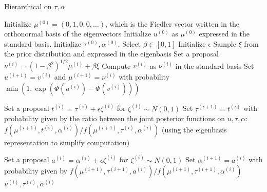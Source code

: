 \documentclass{siamart1116}
\begin{document}
\begin{algorithm}
\caption{Hierarchical on $\tau, \alpha$}
\label{alg:hierarchical_tau_alpha}
\begin{algorithmic}
\State Initialize $\mu^{(0)} = (0, 1, 0, 0, \ldots)$, which is the Fiedler vector written in the orthonormal basis of the eigenvectors
\State Initialize $u^{(0)}$ as $\mu^{(0)}$ expressed in the standard basis.
\State Initialize $\tau^{(0)}, \alpha^{(0)}$. Select $\beta \in [0, 1]$
\State Initialize $\epsilon$
\State Sample $\xi$ from the prior distribution and expressed in the eigenbasis 
\State Set a proposal $\nu^{(i)} = (1- \beta^2)^{1/2}\mu^{(i)} + \beta \xi$
\State Compute $v^{(i)}$ as $\nu^{(i)}$ in the standard basis
\State Set $u^{(i+1)} = v^{(i)}$ and $\mu^{(i+1)} = \nu^{(i)}$ with probability $\min (1, \exp(\Phi(u^{(i)}) - \Phi(v^{(i)})) )$

\State Set a proposal $t^{(i)} = \tau^{(i)} + \epsilon \zeta^{(i)}$ for $\zeta^{(i)} \sim N(0, 1)$ 
\State Set $\tau^{(i+1)} = t^{(i)}$ with probability given by the ratio between the joint posterior functions on $u, \tau, \alpha$: $f(\mu^{(i+1)}, t^{(i)}, \alpha^{(i)})/f(\mu^{(i+1)}, \tau^{(i)}, \alpha^{(i)})$ (using the eigenbasis representation to simplify computation)

\State Set a proposal $a^{(i)} = \alpha^{(i)} + \epsilon \zeta^{(i)}$ for $\zeta^{(i)} \sim N(0, 1)$ 
\State Set $\alpha^{(i+1)} = a^{(i)}$ with probability given by $f(\mu^{(i+1)}, \tau^{(i+1)}, a^{(i)})/f(\mu^{(i+1)}, \tau^{(i+1)}, \alpha^{(i)})$
\EndFor\\
\Return $u^{(i)}, \tau^{(i)}, \alpha^{(i)}$
\end{algorithmic}
\end{algorithm}
\end{document}

